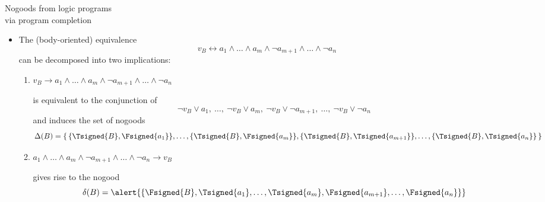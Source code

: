 \begin{frame}{Nogoods from logic programs\\[-1ex]\normalsize via program completion}

  \begin{itemize}
  \item<1-> The (body-oriented) equivalence
    \[
    v_B \leftrightarrow
         a_1     \wedge\dots\wedge      a_m \wedge
    \neg a_{m+1} \wedge\dots\wedge \neg a_n
    \]
    can be decomposed into two implications:
    \medskip
    \begin{enumerate}
    \item<only@2>\normalsize
      \alert{%
      \(
      v_B \to
           a_1     \wedge\dots\wedge      a_m \wedge
      \neg a_{m+1} \wedge\dots\wedge \neg a_n
      \)}

      \smallskip
      is equivalent to the conjunction of
      \[
      \neg v_B \vee  a_1
      ,\ \dots,\
      \neg v_B \vee  a_m
      ,\
      \neg v_B \vee  \neg a_{m+1}
      ,\ \dots,\
      \neg v_B \vee  \neg a_n
      \]
      and induces the set of nogoods
      \alert{\small%
        \[
        \ClNo{B}
        =
        \{\,\{\Tsigned{B},\Fsigned{a_1}\},
        \dots,
        \{\Tsigned{B},\Fsigned{a_m}\},
        \{\Tsigned{B},\Tsigned{a_{m+1}}\},
        \dots,
        \{\Tsigned{B},\Tsigned{a_n}\}\,\}
        \]
      }
    \item<only@3->\normalsize
      \alert{%
      \(
      a_1          \wedge \dots \wedge a_m      \wedge
      \neg a_{m+1} \wedge \dots \wedge \neg a_n
      \rightarrow v_B
      \)}

      \smallskip
      gives rise to the nogood
      \[
      \clno{B}
      =
      \alert{\{\Fsigned{B},\Tsigned{a_1},\dots,\Tsigned{a_m},\Fsigned{a_{m+1}},\dots,\Fsigned{a_n}\}}
      \]
      \bigskip
  \end{enumerate}
\end{itemize}
\end{frame}
